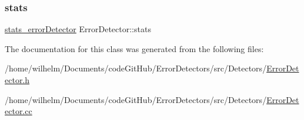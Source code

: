 \subsubsection{\texorpdfstring{stats}{stats}}
{\footnotesize\ttfamily \hyperlink{_error_detector_8h_abbc922e22c7b55f0bd58bea618eec587}{stats\+\_\+error\+Detector} Error\+Detector\+::stats\hspace{0.3cm}{\ttfamily [private]}}



The documentation for this class was generated from the following files\+:\begin{DoxyCompactItemize}
\item 
/home/wilhelm/\+Documents/code\+Git\+Hub/\+Error\+Detectors/src/\+Detectors/\hyperlink{_error_detector_8h}{Error\+Detector.\+h}\item 
/home/wilhelm/\+Documents/code\+Git\+Hub/\+Error\+Detectors/src/\+Detectors/\hyperlink{_error_detector_8cc}{Error\+Detector.\+cc}\end{DoxyCompactItemize}

